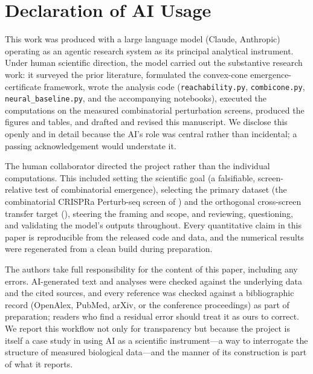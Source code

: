 \section*{Declaration of AI Usage}
\label{sec:ai-declaration}

This work was produced with a large language model (Claude, Anthropic) operating as an
agentic research system as its principal analytical instrument. Under human scientific
direction, the model carried out the substantive research work: it surveyed the prior
literature, formulated the convex-cone emergence-certificate framework, wrote the analysis code
(\texttt{reachability.py}, \texttt{combicone.py}, \texttt{neural\_baseline.py}, and the
accompanying notebooks), executed the computations on the measured combinatorial perturbation
screens, produced the figures and tables, and drafted and revised this manuscript. We disclose this openly and in detail because the AI's role was central rather
than incidental; a passing acknowledgement would understate it.

The human collaborator directed the project rather than the individual computations. This
included setting the scientific goal (a falsifiable, screen-relative test of combinatorial
emergence), selecting the primary dataset (the combinatorial CRISPRa Perturb-seq screen of
\citet{Norman2019}) and the orthogonal cross-screen transfer target
(\citet{Wessels2023}), steering the framing and scope, and reviewing, questioning, and validating the model's
outputs throughout. Every quantitative claim in this paper is reproducible from the released
code and data, and the numerical results were regenerated from a clean build during preparation.

The authors take full responsibility for the content of this paper, including any errors.
AI-generated text and analyses were checked against the underlying data and the cited sources,
and every reference was checked against a bibliographic record (OpenAlex, PubMed, arXiv, or the
conference proceedings) as part of preparation; readers who find a residual error should treat it
as ours to correct. We report this workflow not only for transparency but because the project is
itself a case study in using AI as a scientific instrument---a way to interrogate the structure of
measured biological data---and the manner of its construction is part of what it reports.
